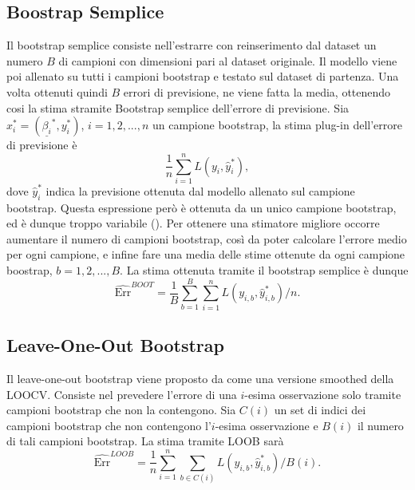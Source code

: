 \subsection{Boostrap Semplice}
\label{sec:sezione5.4.1}

Il bootstrap semplice consiste nell'estrarre con reinserimento dal dataset un numero $B$ di campioni con dimensioni pari al dataset originale. Il modello viene poi allenato su tutti i campioni bootstrap e testato sul dataset di partenza. Una volta ottenuti quindi $B$ errori di previsione, ne viene fatta la media, ottenendo cosi la stima stramite Bootstrap semplice dell'errore di previsione. 
Sia $x^{*}_i =  (\underline{\beta_i}^{*},y^{*}_i)$, $i = 1,2,...,n$ un campione bootstrap, la stima plug-in dell'errore di previsione è
\begin{equation}
\frac{1}{n} \sum_{i=1}^{n} L(y_i, \hat{y}^{*}_i),
\end{equation}
dove $\hat{y}^{*}_i$ indica la previsione ottenuta dal modello allenato sul campione bootstrap.
Questa espressione però è ottenuta da un unico campione bootstrap, ed è dunque troppo variabile (\cite{efron1993}). Per ottenere una stimatore migliore occorre aumentare il numero di campioni bootstrap, così da poter calcolare l'errore medio per ogni campione, e infine fare una media delle stime ottenute da ogni campione boostrap, $b = 1,2,...,B$.
La stima ottenuta tramite il bootstrap semplice è dunque
\begin{equation}
\widehat{\text{Err}}^{BOOT} = \frac{1}{B} \sum_{b=1}^{B} \sum_{i=1}^{n}L(y_{i,b}, \hat{y}^{*}_{i,b})/n.
\end{equation}



\subsection{Leave-One-Out Bootstrap}
\label{sec:sezione5.4.2}

Il leave-one-out bootstrap viene proposto da \textcite{efron1983} come una versione smoothed della LOOCV. Consiste nel prevedere l'errore di una $i$-esima osservazione solo tramite campioni bootstrap che non la contengono.
Sia $C(i)$ un set di indici dei campioni bootstrap che non contengono l'$i$-esima osservazione e $B(i)$ il numero di tali campioni bootstrap.
La stima tramite LOOB sarà
\begin{equation}
\widehat{\text{Err}}^{LOOB} = \frac{1}{n} \sum_{i=1}^{n} \sum\limits_{b \in {C(i)}}L(y_{i,b}, \hat{y}^{*}_{i,b})/B(i).
\end{equation}


